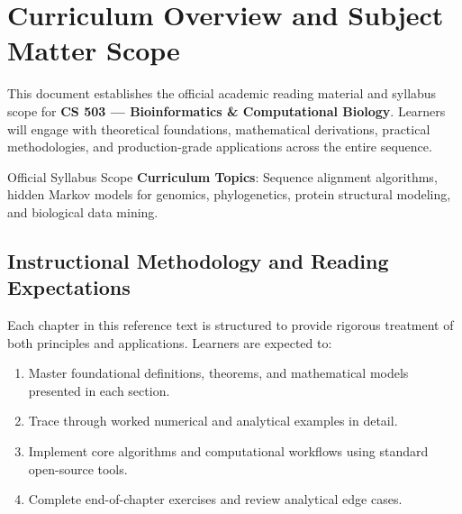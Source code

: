 \section{Curriculum Overview and Subject Matter Scope}

This document establishes the official academic reading material and syllabus scope for \textbf{CS 503 --- Bioinformatics \& Computational Biology}. Learners will engage with theoretical foundations, mathematical derivations, practical methodologies, and production-grade applications across the entire sequence.

\begin{InsightBox}{Official Syllabus Scope}
  \textbf{Curriculum Topics}: Sequence alignment algorithms, hidden Markov models for genomics, phylogenetics, protein structural modeling, and biological data mining.
\end{InsightBox}

\subsection{Instructional Methodology and Reading Expectations}

Each chapter in this reference text is structured to provide rigorous treatment of both principles and applications. Learners are expected to:
\begin{enumerate}
  \item Master foundational definitions, theorems, and mathematical models presented in each section.
  \item Trace through worked numerical and analytical examples in detail.
  \item Implement core algorithms and computational workflows using standard open-source tools.
  \item Complete end-of-chapter exercises and review analytical edge cases.
\end{enumerate}

